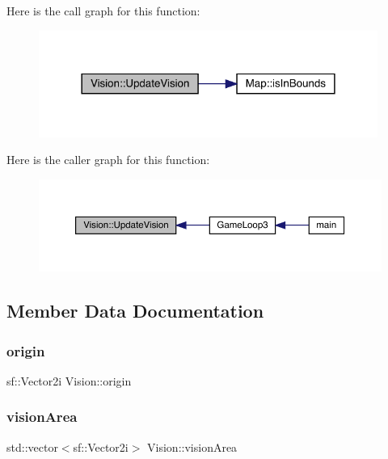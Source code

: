Here is the call graph for this function\+:
\nopagebreak
\begin{figure}[H]
\begin{center}
\leavevmode
\includegraphics[width=314pt]{class_vision_a626452b58aa651ff91e4e60a74ce7443_cgraph}
\end{center}
\end{figure}
Here is the caller graph for this function\+:
\nopagebreak
\begin{figure}[H]
\begin{center}
\leavevmode
\includegraphics[width=350pt]{class_vision_a626452b58aa651ff91e4e60a74ce7443_icgraph}
\end{center}
\end{figure}


\subsection{Member Data Documentation}
\mbox{\label{class_vision_ab68e6f7a554cda7c398168ca150dd4c0}} 
\subsubsection{\texorpdfstring{origin}{origin}}
{\footnotesize\ttfamily sf\+::\+Vector2i Vision\+::origin\hspace{0.3cm}{\ttfamily [private]}}

\mbox{\label{class_vision_a04430228cfbaaa15871d28a68ad7e1b1}} 
\subsubsection{\texorpdfstring{vision\+Area}{visionArea}}
{\footnotesize\ttfamily std\+::vector$<$sf\+::\+Vector2i$>$ Vision\+::vision\+Area\hspace{0.3cm}{\ttfamily [private]}}



